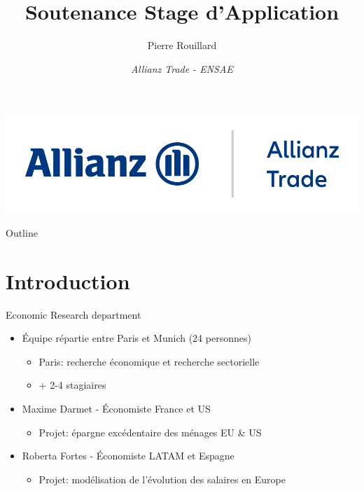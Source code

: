 \documentclass[9pt, xcolor={dvipsnames}]{beamer}
\author{Pierre Rouillard}
\title{Soutenance Stage d'Application}
\institute{xx/xx/xxxx \\ Maître de stage: Françoise Huang}
\date{\textit{Allianz Trade - ENSAE}}
\begin{document}
\begin{frame}[plain]
\titlepage
\centering
\includegraphics[width=.5\textwidth]{Allianz_Trade.png}
\end{frame}

\begin{frame}{Outline}
  \tableofcontents
\end{frame}

\section{Introduction}
\begin{frame}[label=intro]{Economic Research department}
\begin{itemize}
\item Équipe répartie entre Paris et Munich (24 personnes)\\
   \begin{itemize}
    \item Paris: recherche économique et recherche sectorielle
    \item + 2-4 stagiaires
   \end{itemize}
\item Maxime Darmet - Économiste France et US
  \begin{itemize}
    \item Projet: épargne excédentaire des ménages EU \& US
  \end{itemize}
\item Roberta Fortes - Économiste LATAM et Espagne
  \begin{itemize}
    \item Projet: modélisation de l'évolution des salaires en Europe
  \end{itemize}
\end{itemize}
\end{frame}

\end{document}
